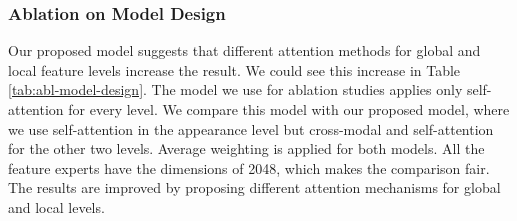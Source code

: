 \documentclass[lettersize,journal]{IEEEtran}
\begin{document}
\subsubsection{Ablation on Model Design}

Our proposed model suggests that different attention methods for global and local feature levels increase the result. We could see this increase in Table \ref{tab:abl-model-design}. The model we use for ablation studies applies only self-attention for every level. We compare this model with our proposed model, where we use self-attention in the appearance level but cross-modal and self-attention for the other two levels. Average weighting is applied for both models. All the feature experts have the dimensions of 2048, which makes the comparison fair. The results are improved by proposing different attention mechanisms for global and local levels.
\end{document}
